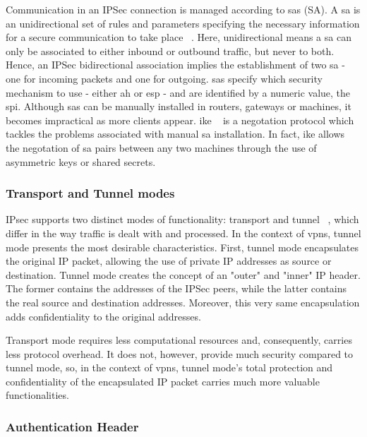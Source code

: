 \documentclass[11pt,twoside,a4paper]{report}
\begin{document}
Communication in an IPSec connection is managed according to \acrlong{sa}s (SA). A \acrshort{sa} is an unidirectional set of rules and parameters specifying the necessary information for a secure communication to take place ~\cite{rfc4301}. Here, unidirectional means a \acrshort{sa} can only be associated to either inbound or outbound traffic, but never to both. Hence, an IPSec bidirectional association implies the establishment of two \acrshort{sa} - one for incoming packets and one for outgoing. \acrshort{sa}s specify which security mechanism to use - either \acrfull{ah} or \acrfull{esp} - and are identified by a numeric value, the \acrfull{spi}. Although \acrshort{sa}s can be manually installed in routers, gateways or machines, it becomes impractical as more clients appear. \acrfull{ike} ~\cite{rfc7296} is a negotation protocol which tackles the problems associated with manual \acrshort{sa} installation. In fact, \acrshort{ike} allows the negotation of \acrshort{sa} pairs between any two machines through the use of asymmetric keys or shared secrets.

\subsubsection{Transport and Tunnel modes}

IPsec supports two distinct modes of functionality: transport and tunnel ~\cite{rfc4301}, which differ in the way traffic is dealt with and processed. In the context of \acrshort{vpn}s, tunnel mode presents the
most desirable characteristics. First, tunnel mode encapsulates the original IP packet, allowing the use of private IP addresses as source or destination. Tunnel mode creates the concept of an "outer" and "inner" IP header. The former contains the addresses of the IPSec peers, while the latter contains the real source and destination addresses. Moreover, this very same encapsulation adds confidentiality to the original addresses.

Transport mode requires less computational resources and, consequently, carries less protocol overhead. It does not, however, provide much security compared to tunnel mode, so, in the context of \acrshort{vpn}s, tunnel mode's total protection and confidentiality of the encapsulated IP packet carries much more valuable functionalities.

\subsubsection{Authentication Header}
\end{document}
